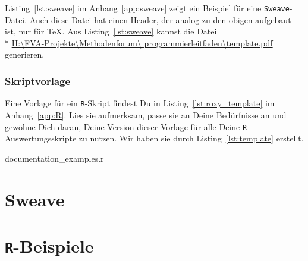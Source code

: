 \documentclass[twoside]{scrreprt}
\providecommand{\R}{\texttt{R}}
\providecommand{\code}[1]{\texttt{#1}}
\providecommand{\proot}{%
H:\textbackslash{}FVA-Projekte\textbackslash{}Methodenforum\textbackslash{}%
}
\providecommand{\pdir}{\proot{}programmierleitfaden\textbackslash{}}
\begin{document}
Listing~\ref{lst:sweave} im Anhang~\ref{app:sweave} zeigt ein Beispiel
f\"u{}r eine \code{Sweave}-Datei.
Auch diese Datei hat einen Header, der analog zu den obigen aufgebaut ist, nur
f\"u{}r \TeX{}.
Aus  Listing~\ref{lst:sweave} kannst die Datei \\*
\href{%
template.pdf}{%
\pdir{}template.pdf} 
generieren.

\subsection{Skriptvorlage
 }
Eine Vorlage f\"ur ein \R{}-Skript findest Du in Listing~\ref{lst:roxy_template}
im Anhang~\ref{app:R}.
Lies sie aufmerksam, passe sie an Deine Bed\"u{}rfnisse an und gew\"o{}hne Dich
daran, Deine Version dieser Vorlage f\"u{}r alle Deine \R{}-Auswertungsskripte
zu nutzen.
Wir haben sie durch Listing~\ref{lst:template} erstellt.

{documentation_examples.r}




\printindex
\appendix
\chapter{Sweave\label{app:sweave}}

\pagebreak
\chapter{\R{}-Beispiele\label{app:R}}

%
%
%
\end{document}
